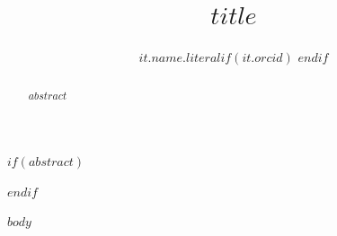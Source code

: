 \documentclass[
  manuscript=$if(manuscript)$$manuscript$$else$article$endif$,
  layout=$if(layout)$$layout$$else$preprint$endif$,
  year=$if(year)$$year$$else$20xx$endif$,
  volume=$if(volume)$$volume$$else$x$endif$,
]{den}
\title{$title$}
\author{$it.name.literal$$if(it.orcid)$ \orcid{$it.orcid$}$endif$}
\affiliation{$it.name$}
\begin{document}
$if(abstract)$
\begin{abstract}
$abstract$
\end{abstract}
$endif$

$body$
\end{document}
